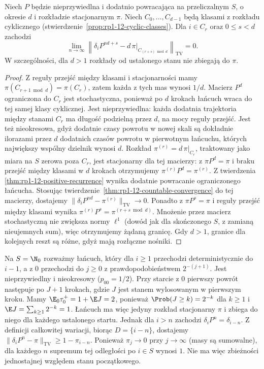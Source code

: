 \begin{wniosek}
Niech $P$ będzie nieprzywiedlna i dodatnio powracająca
na przeliczalnym $S$, o okresie $d$ i rozkładzie
stacjonarnym $\pi$. Niech $C_0,\ldots,C_{d-1}$
będą klasami z rozkładu cyklicznego
(stwierdzenie~\ref{prop:rp1-12-cyclic-classes}).
Dla $i\in C_r$ oraz $0\leq s<d$ zachodzi
\[
\lim_{n\to\infty}\left\|\delta_iP^{nd+s}
-d\,\pi|_{C_{(r+s)\bmod d}}\right\|_{\mathrm{TV}}=0.
\]
W szczególności, dla $d>1$ rozkłady od ustalonego
stanu nie zbiegają do $\pi$.
\end{wniosek}
\begin{proof}
Z reguły przejść między klasami i stacjonarności
mamy $\pi(C_{r+1\bmod d})=\pi(C_r)$, zatem
każda z tych mas wynosi $1/d$. Macierz $P^d$
ograniczona do $C_r$ jest stochastyczna, ponieważ
po $d$ krokach łańcuch wraca do tej samej klasy
cyklicznej. Jest nieprzywiedlna: każda dodatnia
trajektoria między stanami $C_r$ ma długość podzielną
przez $d$, na mocy reguły przejść. Jest też
nieokresowa, gdyż dodatnie czasy powrotu w nowej
skali są dokładnie ilorazami przez $d$ dodatnich
czasów powrotu w pierwotnym łańcuchu, których
największy wspólny dzielnik wynosi $d$.
Rozkład $\pi^{(r)}=d\,\pi|_{C_r}$, traktowany jako
miara na $S$ zerowa poza $C_r$, jest stacjonarny
dla tej macierzy: z $\pi P^d=\pi$ i braku przejść
między klasami w $d$ krokach otrzymujemy
$\pi^{(r)}P^d=\pi^{(r)}$. Z twierdzenia
\ref{thm:rp1-12-positive-recurrence} wynika
dodatnie powracanie ograniczonego łańcucha.
Stosując twierdzenie~\ref{thm:rp1-12-countable-convergence}
do tej macierzy, dostajemy
$\|\delta_i P^{nd}-\pi^{(r)}\|_{\mathrm{TV}}\to0$.
Ponadto z $\pi P^s=\pi$ i reguły przejść między
klasami wynika $\pi^{(r)}P^s=\pi^{(r+s\bmod d)}$.
Mnożenie przez macierz stochastyczną nie zwiększa
normy $\ell^1$ (dowód jak dla skończonego $S$,
z zamianą nieujemnych sum), więc otrzymujemy
żądaną granicę. Gdy $d>1$, granice dla kolejnych
reszt są różne, gdyż mają rozłączne nośniki.
\end{proof}

\begin{przyklad}
Na $S=\N_0$ rozważmy łańcuch, który dla $i\geq1$
przechodzi deterministycznie do $i-1$, a z $0$
przechodzi do $j\geq0$ z prawdopodobieństwem
$2^{-(j+1)}$. Jest nieprzywiedlny i nieokresowy
($p_{00}=1/2$). Przy starcie z $0$ pierwszy powrót
następuje po $J+1$ krokach, gdzie $J$ jest stanem
wylosowanym w pierwszym kroku. Mamy
$\E_0\tau_0^+=1+\E J=2$, ponieważ
$\Prob(J\geq k)=2^{-k}$ dla $k\geq1$ i
$\E J=\sum_{k\geq1}2^{-k}=1$.
Łańcuch ma więc jedyny rozkład stacjonarny $\pi$
i zbiega do niego dla każdego ustalonego startu.
Jednak dla $i>n$ zachodzi $\delta_iP^n=\delta_{i-n}$.
Z definicji całkowitej wariacji, biorąc
$D=\{i-n\}$, dostajemy
$\|\delta_iP^n-\pi\|_{\mathrm{TV}}\geq1-\pi_{i-n}$.
Ponieważ $\pi_j\to0$ przy $j\to\infty$ (masy są
sumowalne), dla każdego $n$ supremum tej odległości
po $i\in S$ wynosi $1$. Nie ma więc zbieżności
jednostajnej względem stanu początkowego.
\end{przyklad}


